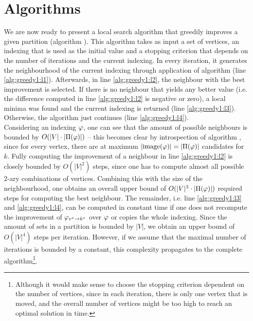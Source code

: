 

\section{Algorithms} \label{sec:algorithms}

We are now ready to present a local search algorithm that greedily improves a given partition (algorithm \emph{}). This algorithm takes as input a set of vertices, an indexing that is used as the initial value and a stopping criterion that depends on the number of iterations and the current indexing. In every iteration, it generates the neighbourhood of the current indexing through application of algorithm \emph{} (line \ref{alg:greedy1:l1}). Afterwards, in line \ref{alg:greedy1:l2}, the neighbour with the best improvement is selected. If there is no neighbour that yields any better value (i.e. the difference computed in line \ref{alg:greedy1:l2} is negative or zero), a local minima was found and the current indexing is returned (line \ref{alg:greedy1:l3}). Otherwise, the algorithm just continues (line \ref{alg:greedy1:l4}). \\
Considering an indexing $\varphi$, one can see that the amount of possible neighbours is bounded by $O(|V| \cdot |\Pi(\varphi) |)$ -- this becomes clear by introspection of algorithm \emph{}, since for every vertex, there are at maximum $|\mathrm{image}(\varphi)| = |\Pi(\varphi)|$ candidates for $k$. Fully computing the improvement of a neighbour in line \ref{alg:greedy1:l2} is closely bounded by $O(|V|^2)$ steps, since one has to compute almost all possible 2-ary combinations of vertices. Combining this with the size of the neighbourhood, one obtains an overall upper bound of $O(|V|^3 \cdot |\Pi(\varphi)|)$ required steps for computing the best neighbour. The remainder, i.e. line \ref{alg:greedy1:l3} and \ref{alg:greedy1:l4}, can be computed in constant time if one does not recompute the improvement of $\varphi_{v^*\rightarrow k^*}$ over $\varphi$ or copies the whole indexing. Since the amount of sets in a partition is bounded by $|V|$, we obtain an upper bound of $O(|V|^4)$ steps per iteration. However, if we assume that the maximal number of iterations is bounded by a constant, this complexity propagates to the complete algorithm\footnote{Although it would make sense to choose the stopping criterion dependent on the number of vertices, since in each iteration, there is only one vertex that is moved, and the overall number of vertices might be too high to reach an optimal solution in time.}.


